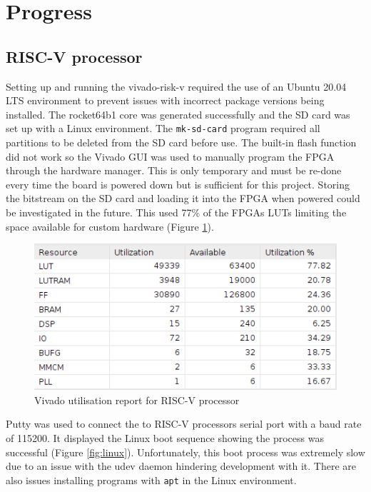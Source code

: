 \section{Progress}
\label{sec:progress}

\subsection{RISC-V processor}
Setting up and running the vivado-risk-v \cite{vivado-risk-v} required the use of an Ubuntu 20.04 LTS environment to prevent issues with incorrect package versions being installed. The rocket64b1 core was generated successfully and the SD card was set up with a Linux environment. The \texttt{mk-sd-card} program required all partitions to be deleted from the SD card before use. The built-in flash function did not work so the Vivado GUI was used to manually program the FPGA through the hardware manager. This is only temporary and must be re-done every time the board is powered down but is sufficient for this project. Storing the bitstream on the SD card and loading it into the FPGA when powered could be investigated in the future. This used 77\% of the FPGAs LUTs limiting the space available for custom hardware (Figure \ref{fig:LUT_usage}).

\begin{figure}[H]
	\centering
	\includegraphics[scale=0.6]{../common/vivado-risk-v Uilization.png}
	\caption{Vivado utilisation report for RISC-V processor}
	\label{fig:LUT_usage}
\end{figure}

Putty was used to connect the to RISC-V processors serial port with a baud rate of 115200. It displayed the Linux boot sequence showing the process was successful (Figure \ref{fig:linux}). Unfortunately, this boot process was extremely slow due to an issue with the udev daemon hindering development with it. There are also issues installing programs with \texttt{apt} in the Linux environment.

